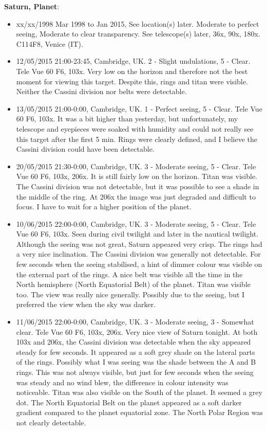 {\bf Saturn, Planet}:
\begin{itemize}
\item xx/xx/1998 Mar 1998 to Jan 2015, See location(s) later. Moderate to perfect seeing, Moderate to clear transparency. See telescope(s) later, 36x, 90x, 180x. C114F8, Venice (IT).
\item 12/05/2015 21:00-23:45, Cambridge, UK. 2 - Slight undulations, 5 - Clear. Tele Vue 60 F6, 103x. Very low on the horizon and therefore not the best moment for viewing this target. Despite this, rings and titan were visible. Neither the Cassini division nor belts were detectable.
\item 13/05/2015 21:00-0:00, Cambridge, UK. 1 - Perfect seeing, 5 - Clear. Tele Vue 60 F6, 103x. It was a bit higher than yesterday, but unfortunately, my telescope and eyepieces were soaked with humidity and could not really see this target after the first 5 min. Rings were clearly defined, and I believe the Cassini division could have been detectable.
\item 20/05/2015 21:30-0:00, Cambridge, UK. 3 - Moderate seeing, 5 - Clear. Tele Vue 60 F6, 103x, 206x. It is still fairly low on the horizon. Titan was visible. The Cassini division was not detectable, but it was possible to see a shade in the middle of the ring. At 206x the image was just degraded and difficult to focus. I have to wait for a higher position of the planet.
\item 10/06/2015 22:00-0:00, Cambridge, UK. 3 - Moderate seeing, 5 - Clear. Tele Vue 60 F6, 103x. Seen during civil twilight and later in the nautical twilight. Although the seeing was not great, Saturn appeared very crisp. The rings had a very nice inclination. The Cassini division was generally not detectable. For few seconds when the seeing stabilised, a hint of dimmer colour was visible on the external part of the rings. A nice belt was visible all the time in the North hemisphere (North Equatorial Belt) of the planet. Titan was visible too. The view was really nice generally. Possibly due to the seeing, but I preferred the view when the sky was darker. 
\item 11/06/2015 22:00-0:00, Cambridge, UK. 3 - Moderate seeing, 3 - Somewhat clear. Tele Vue 60 F6, 103x, 206x. Very nice view of Saturn tonight. At both 103x and 206x, the Cassini division was detectable when the sky appeared steady for few seconds. It appeared as a soft grey shade on the lateral parts of the rings. Possibly what I was seeing was the shade between the A and B rings. This was not always visible, but just for few seconds when the seeing was steady and no wind blew, the difference in colour intensity was noticeable. Titan was also visible on the South of the planet. It seemed a grey dot. The North Equatorial Belt on the planet appeared as a soft darker gradient compared to the planet equatorial zone. The North Polar Region was not clearly detectable.

\end{itemize}
